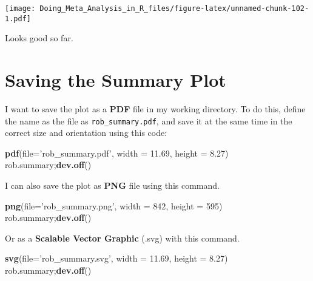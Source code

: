 \documentclass[]{book}
\newenvironment{Shaded}{\begin{snugshade}}{\end{snugshade}}
\newcommand{\KeywordTok}[1]{\textcolor[rgb]{0.13,0.29,0.53}{\textbf{#1}}}
\newcommand{\DataTypeTok}[1]{\textcolor[rgb]{0.13,0.29,0.53}{#1}}
\newcommand{\DecValTok}[1]{\textcolor[rgb]{0.00,0.00,0.81}{#1}}
\newcommand{\FloatTok}[1]{\textcolor[rgb]{0.00,0.00,0.81}{#1}}
\newcommand{\StringTok}[1]{\textcolor[rgb]{0.31,0.60,0.02}{#1}}
\newcommand{\NormalTok}[1]{#1}
\theoremstyle{definition}
\theoremstyle{definition}
\theoremstyle{definition}
\theoremstyle{remark}
\begin{document}
\texttt{[image: Doing\_Meta\_Analysis\_in\_R\_files/figure-latex/unnamed-chunk-102-1.pdf]}

Looks good so far.

\hypertarget{saving}{\section{Saving the Summary Plot}\label{saving}}

I want to save the plot as a \textbf{PDF} file in my working directory.
To do this, define the name as the file as \texttt{rob\_summary.pdf},
and save it at the same time in the correct size and orientation using
this code:

\begin{Shaded}
\begin{Highlighting}[]
\KeywordTok{pdf}\NormalTok{(}\DataTypeTok{file=}\StringTok{'rob_summary.pdf'}\NormalTok{, }\DataTypeTok{width =} \FloatTok{11.69}\NormalTok{, }\DataTypeTok{height =} \FloatTok{8.27}\NormalTok{) }
\NormalTok{rob.summary;}\KeywordTok{dev.off}\NormalTok{() }
\end{Highlighting}
\end{Shaded}

I can also save the plot as \textbf{PNG} file using this command.

\begin{Shaded}
\begin{Highlighting}[]
\KeywordTok{png}\NormalTok{(}\DataTypeTok{file=}\StringTok{'rob_summary.png'}\NormalTok{, }\DataTypeTok{width =} \DecValTok{842}\NormalTok{, }\DataTypeTok{height =} \DecValTok{595}\NormalTok{) }
\NormalTok{rob.summary;}\KeywordTok{dev.off}\NormalTok{() }
\end{Highlighting}
\end{Shaded}

Or as a \textbf{Scalable Vector Graphic} (.svg) with this command.

\begin{Shaded}
\begin{Highlighting}[]
\KeywordTok{svg}\NormalTok{(}\DataTypeTok{file=}\StringTok{'rob_summary.svg'}\NormalTok{, }\DataTypeTok{width =} \FloatTok{11.69}\NormalTok{, }\DataTypeTok{height =} \FloatTok{8.27}\NormalTok{) }
\NormalTok{rob.summary;}\KeywordTok{dev.off}\NormalTok{() }
\end{Highlighting}
\end{Shaded}


\end{document}
